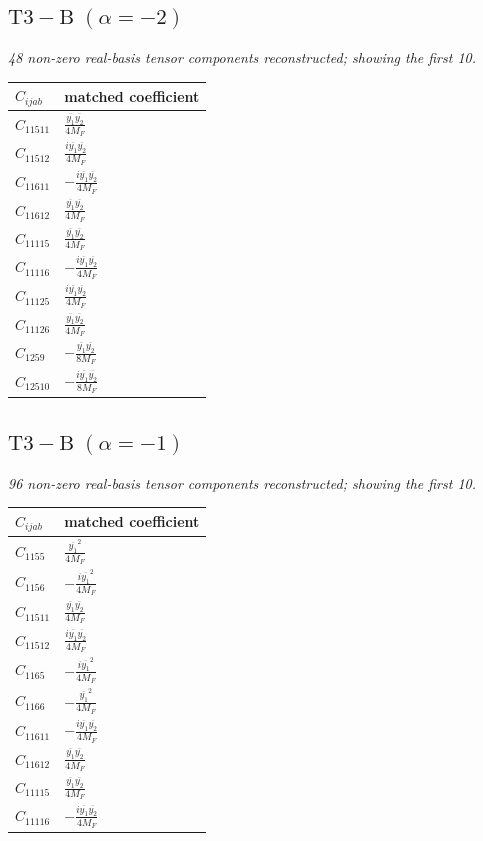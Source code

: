 \documentclass[9pt]{article}
\begin{document}
\subsection*{$ \mathrm{T3-B}\;(\alpha=-2) $}
\textit{48 non-zero real-basis tensor components reconstructed; showing the first 10.}
\begin{longtable}{@{}ll@{}}
\toprule
$C_{ijab}$ & matched coefficient \\
\midrule
$C_{11511}$ & $ \frac{\overline{y_{1}} \overline{y_{2}}}{4 M_F} $ \\
$C_{11512}$ & $ \frac{i \overline{y_{1}} \overline{y_{2}}}{4 M_F} $ \\
$C_{11611}$ & $ - \frac{i \overline{y_{1}} \overline{y_{2}}}{4 M_F} $ \\
$C_{11612}$ & $ \frac{\overline{y_{1}} \overline{y_{2}}}{4 M_F} $ \\
$C_{11115}$ & $ \frac{\overline{y_{1}} \overline{y_{2}}}{4 M_F} $ \\
$C_{11116}$ & $ - \frac{i \overline{y_{1}} \overline{y_{2}}}{4 M_F} $ \\
$C_{11125}$ & $ \frac{i \overline{y_{1}} \overline{y_{2}}}{4 M_F} $ \\
$C_{11126}$ & $ \frac{\overline{y_{1}} \overline{y_{2}}}{4 M_F} $ \\
$C_{1259}$ & $ - \frac{\overline{y_{1}} \overline{y_{2}}}{8 M_F} $ \\
$C_{12510}$ & $ - \frac{i \overline{y_{1}} \overline{y_{2}}}{8 M_F} $ \\
\bottomrule
\end{longtable}
\subsection*{$ \mathrm{T3-B}\;(\alpha=-1) $}
\textit{96 non-zero real-basis tensor components reconstructed; showing the first 10.}
\begin{longtable}{@{}ll@{}}
\toprule
$C_{ijab}$ & matched coefficient \\
\midrule
$C_{1155}$ & $ \frac{\overline{y_{1}}^{2}}{4 M_F} $ \\
$C_{1156}$ & $ - \frac{i \overline{y_{1}}^{2}}{4 M_F} $ \\
$C_{11511}$ & $ \frac{\overline{y_{1}} \overline{y_{2}}}{4 M_F} $ \\
$C_{11512}$ & $ \frac{i \overline{y_{1}} \overline{y_{2}}}{4 M_F} $ \\
$C_{1165}$ & $ - \frac{i \overline{y_{1}}^{2}}{4 M_F} $ \\
$C_{1166}$ & $ - \frac{\overline{y_{1}}^{2}}{4 M_F} $ \\
$C_{11611}$ & $ - \frac{i \overline{y_{1}} \overline{y_{2}}}{4 M_F} $ \\
$C_{11612}$ & $ \frac{\overline{y_{1}} \overline{y_{2}}}{4 M_F} $ \\
$C_{11115}$ & $ \frac{\overline{y_{1}} \overline{y_{2}}}{4 M_F} $ \\
$C_{11116}$ & $ - \frac{i \overline{y_{1}} \overline{y_{2}}}{4 M_F} $ \\
\bottomrule
\end{longtable}
\end{document}
